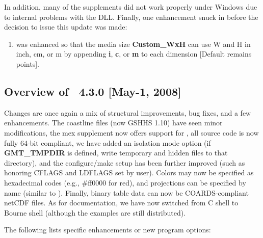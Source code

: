In addition, many of the supplements did not work properly under Windows due to internal problems with the DLL.  Finally,
one enhancement snuck in before the decision to issue this update was made:
\begin{enumerate}
\item {} was enhanced so that the media size {\bf Custom\_WxH} can use W and H in inch, cm, or m
by appending {\bf i}, {\bf c}, or {\bf m} to each dimension [Default remains points].
\end{enumerate}

\subsection{Overview of \gmt\ 4.3.0 [May-1, 2008]}

Changes are once again a mix of structural improvements, bug fixes, and a few enhancements.
The coastline files (now GSHHS 1.10) have seen minor modifications, the mex supplement now offers
support for , all source code is now fully
64-bit compliant, we have added an isolation mode option (if \textbf{GMT\_TMPDIR} is defined, write
temporary and hidden files to that directory),
and the configure/make setup has been further improved (such as honoring CFLAGS and LDFLAGS set by user).
Colors may now be specified
as hexadecimal codes (e.g., \#ff0000 for red), and projections can be specified by name
(similar to ).  Finally, binary table
data can now be COARDS-compliant netCDF files. As for documentation, we have now switched from
C shell to Bourne shell (although the  examples are still distributed).

The following lists specific enhancements or new program options:

